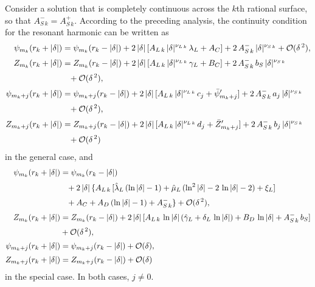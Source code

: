 \documentclass[12pt,prb,aps]{revtex4-1}
\begin{document}
Consider a solution that is completely continuous across the $k$th rational surface, so that $A_{S\,k}^-=A_{S\,k}^+$. According to the
preceding analysis, the continuity condition for the resonant harmonic can be written as
\begin{align}
\psi_{m_k}(r_k+|\delta|) &= \psi_{m_k}(r_k-|\delta|) + 2\,|\delta|\,[A_{L\,k}\,|\delta|^{\nu_{L\,k}}\,\lambda_L + A_C] + 2\,A_{S\,k}^-\,|\delta|^{\nu_{S\,k}}+ {\cal O}(\delta^{\,2}),\\[0.5ex]
Z_{m_k} (r_k+|\delta|) &=  Z_{m_k}(r_k-|\delta|) + 2\,|\delta|\,[A_{L\,k}\,|\delta|^{\nu_{L\,k}}\,\gamma_L + B_C] + 2\,A_{S\,k}^-\,b_S\,|\delta|^{\nu_{S\,k}} 
\nonumber\\[0.5ex]&\phantom{=}+ {\cal O}(\delta^{\,2}),\\[0.5ex]
\psi_{m_k+j}(r_k+|\delta|) &= \psi_{m_k+j}(r_k-|\delta|) +2\,|\delta|\,[A_{L\,k}\,|\delta|^{\nu_{L\,k}}\,c_j + \bar{\psi}_{m_k+j}'] + 2\,A_{S\,k}^-\,a_j\,|\delta|^{\nu_{S\,k}}\nonumber\\[0.5ex]&\phantom{=} +{\cal O}(\delta^{\,2}),\\[0.5ex]
Z_{m_k+j}(r_k+|\delta|) &= Z_{m_k+j}(r_k-|\delta|) +2\,|\delta|\,[A_{L\,k}\,|\delta|^{\nu_{L\,k}}\,d_j + \bar{Z}_{m_k+j}'] + 2\,A_{S\,k}^-\,b_j\,|\delta|^{\nu_{S\,k}}
\nonumber\\[0.5ex]&\phantom{=}+ {\cal O}(\delta^{\,2})
\end{align}
in the general case, and 
\begin{align}
\psi_{m_k}(r_k+|\delta|) &= \psi_{m_k}(r_k-|\delta|) \nonumber\\[0.5ex]
&\phantom{=}+ 2\,|\delta|\,\{A_{L\,k}\,[\hat{\lambda}_L\,(\ln|\delta|-1)+\hat{\mu}_L\,(\ln^2|\delta|-2\,\ln|\delta|-2)+ \xi_L]\nonumber\\[0.5ex]
&\phantom{=}+ A_C
+A_D\,(\ln|\delta|-1) + A_{S\,k}^-\}+ {\cal O}(\delta^{\,2}),\\[0.5ex]
Z_{m_k} (r_k+|\delta|) &=  Z_{m_k}(r_k-|\delta|) + 2\,|\delta|\,[A_{L\,k}\,\ln|\delta| \,(\hat{\gamma}_L+\delta_L\,\ln|\delta|)+ B_D\,\ln|\delta|
+A_{S\,k}^-\,b_{S}]\nonumber\\[0.5ex]&+ {\cal O}(\delta^{\,2}),\\[0.5ex]
\psi_{m_k+j}(r_k+|\delta|) &= \psi_{m_k+j}(r_k-|\delta|)+{\cal O}(\delta),\\[0.5ex]
Z_{m_k+j}(r_k+|\delta|) &= Z_{m_k+j}(r_k-|\delta|)+{\cal O}(\delta)
\end{align}
in the special case. In both cases, $j\neq 0$.
\end{document}

